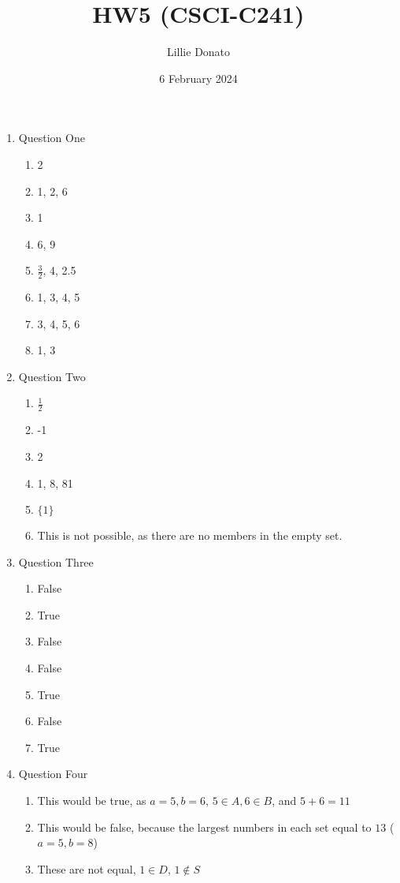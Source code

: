 \documentclass{article}
\title{HW5 (CSCI-C241)}
\author{Lillie Donato}
\date{6 February 2024}
\begin{document}
\maketitle

\begin{enumerate}
    \item Question One
    \begin{enumerate}
        \item 2
        \item 1, 2, 6
        \item 1
        \item 6, 9
        \item $\frac{3}{2}$, 4, 2.5
        \item 1, 3, 4, 5
        \item 3, 4, 5, 6
        \item 1, 3
    \end{enumerate}
    \item Question Two
    \begin{enumerate}
        \item $\frac{1}{2}$
        \item -1
        \item 2
        \item 1, 8, 81
        \item $\{1\}$
        \item This is not possible, as there are no members in the empty set.
    \end{enumerate}
    \item Question Three
    \begin{enumerate}
        \item False
        \item True
        \item False
        \item False
        \item True
        \item False
        \item True
    \end{enumerate}
    \item Question Four
    \begin{enumerate}
        \item This would be true, as $a = 5, b = 6$, $5 \in A, 6 \in B$, and $5 + 6 = 11$
        \item This would be false, because the largest numbers in each set equal to $13$ ($a = 5, b = 8$)
        \item These are not equal, $1 \in D$, $1 \notin S$

\end{enumerate}
\end{enumerate}
\end{document}
